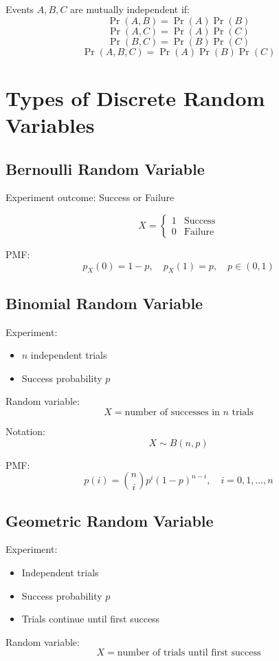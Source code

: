 \documentclass[11pt]{article}
\begin{document}
Events $A,B,C$ are mutually independent if:
\[
\Pr(A,B) = \Pr(A)\Pr(B)
\]
\[
\Pr(A,C) = \Pr(A)\Pr(C)
\]
\[
\Pr(B,C) = \Pr(B)\Pr(C)
\]
\[
\Pr(A,B,C) = \Pr(A)\Pr(B)\Pr(C)
\]

\section{Types of Discrete Random Variables}

\subsection{Bernoulli Random Variable}

Experiment outcome: Success or Failure

\[
X =
\begin{cases}
1 & \text{Success} \\
0 & \text{Failure}
\end{cases}
\]

PMF:
\[
p_X(0) = 1-p, \quad p_X(1) = p, \quad p \in (0,1)
\]

\subsection{Binomial Random Variable}

Experiment:
\begin{itemize}
    \item $n$ independent trials
    \item Success probability $p$
\end{itemize}

Random variable:
\[
X = \text{number of successes in } n \text{ trials}
\]

Notation:
\[
X \sim B(n,p)
\]

PMF:
\[
p(i) = \binom{n}{i} p^i (1-p)^{n-i}, \quad i = 0,1,\ldots,n
\]

\subsection{Geometric Random Variable}

Experiment:
\begin{itemize}
    \item Independent trials
    \item Success probability $p$
    \item Trials continue until first success
\end{itemize}

Random variable:
\[
X = \text{number of trials until first success}
\]
\end{document}
